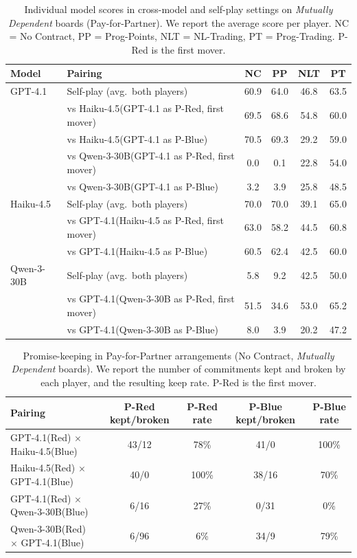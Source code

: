 \documentclass{article} %
\newcommand{\PTC}{Prog-Trading\xspace}
\newcommand{\NLTC}{NL-Trading\xspace}
\newcommand{\PPC}{Prog-Points\xspace}
\newcommand{\GPT}{GPT-4.1\xspace}
\newcommand{\Haiku}{Haiku-4.5\xspace}
\newcommand{\Qthirty}{Qwen-3-30B\xspace}
\newcommand{\PforP}{Pay-for-Partner\xspace}
\begin{document}
\begin{table}[t]
\centering
\begin{small}
\begin{tabular}{llcccc}
\toprule
\textbf{Model} & \textbf{Pairing} & \textbf{NC} & \textbf{PP} & \textbf{NLT} & \textbf{PT} \\
\midrule
\GPT & Self-play (avg.\ both players) & 60.9 & 64.0 & 46.8 & 63.5 \\
 & vs \Haiku (\GPT as P-Red, first mover) & 69.5 & 68.6 & 54.8 & 60.0 \\
 & vs \Haiku (\GPT as P-Blue) & 70.5 & 69.3 & 29.2 & 59.0 \\
 & vs \Qthirty (\GPT as P-Red, first mover) & 0.0 & 0.1 & 22.8 & 54.0 \\
 & vs \Qthirty (\GPT as P-Blue) & 3.2 & 3.9 & 25.8 & 48.5 \\
\midrule
\Haiku & Self-play (avg.\ both players) & 70.0 & 70.0 & 39.1 & 65.0 \\
 & vs \GPT (\Haiku as P-Red, first mover) & 63.0 & 58.2 & 44.5 & 60.8 \\
 & vs \GPT (\Haiku as P-Blue) & 60.5 & 62.4 & 42.5 & 60.0 \\
\midrule
\Qthirty & Self-play (avg.\ both players) & 5.8 & 9.2 & 42.5 & 50.0 \\
 & vs \GPT (\Qthirty as P-Red, first mover) & 51.5 & 34.6 & 53.0 & 65.2 \\
 & vs \GPT (\Qthirty as P-Blue) & 8.0 & 3.9 & 20.2 & 47.2 \\
\bottomrule
\end{tabular}
\end{small}
\caption{Individual model scores in cross-model and self-play settings on \textit{Mutually Dependent} boards (\PforP). We report the average score per player. NC = No Contract, PP = \PPC, NLT = \NLTC, PT = \PTC. P-Red is the first mover.}
\label{tab:cross_model_scores}
\end{table}

\begin{table}[t]
\centering
\begin{small}
\begin{tabular}{lcccc}
\toprule
\textbf{Pairing} & \textbf{P-Red kept/broken} & \textbf{P-Red rate} & \textbf{P-Blue kept/broken} & \textbf{P-Blue rate} \\
\midrule
\GPT (Red) $\times$ \Haiku (Blue) & 43/12 & 78\% & 41/0 & 100\% \\
\Haiku (Red) $\times$ \GPT (Blue) & 40/0 & 100\% & 38/16 & 70\% \\
\GPT (Red) $\times$ \Qthirty (Blue) & 6/16 & 27\% & 0/31 & 0\% \\
\Qthirty (Red) $\times$ \GPT (Blue) & 6/96 & 6\% & 34/9 & 79\% \\
\bottomrule
\end{tabular}
\end{small}
\caption{Promise-keeping in \PforP arrangements (No Contract, \textit{Mutually Dependent} boards). We report the number of commitments kept and broken by each player, and the resulting keep rate. P-Red is the first mover.}
\label{tab:promise_keeping}
\end{table}
\end{document}
